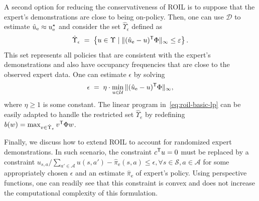\documentclass[10pt]{article}
\renewcommand{\cite}{\citep}
\theoremstyle{plain}
\theoremstyle{remark}
\begin{document}
A second option for reducing the conservativeness of ROIL is to suppose that the expert's demonstrations are close to being on-policy.
Then, one can use $\mathcal{D}$ to estimate $\hat{u}_{\mathrm{e}} \approx u_{\mathrm{e}}^{\mathnormal{\star}} $ and consider the set $\hat{\Upsilon}_{\epsilon}$ defined as
%
\begin{equation}
\label{linf_constraint}
\hat{\Upsilon}_{\epsilon}
\;=\;
\left\{ u \in \Upsilon \mid \| (\hat{u}_{\mathrm{e}} - u)^{\mathsf{T}} \Phi \|_{\infty} \le \varepsilon \right\}.
\end{equation}
This set represents all policies that are consistent with the expert's demonstrations and also have occupancy frequencies that are close to the observed expert data. One can estimate $\epsilon$ by solving
\begin{equation}\label{eq:minimal-epsilon}
\epsilon \; =\;  \eta \cdot \min_{u\in \mathcal{U}}
\| (\hat{u}_{\mathrm{e}} - u)^{\mathsf{T}} \Phi \|_{\infty}, 
\end{equation}
where $\eta \ge 1$ is some constant. %
The linear program in~\eqref{eq:roil-basic-lp} can be easily adapted to handle the restricted set $\hat{\Upsilon}_e$ by redefining $b(w) = \max_{v \in \hat{\Upsilon}_e} v^{\mathsf{T}} \Phi  w$. 

Finally, we discuss how to extend ROIL to account for randomized expert demonstrations. In such scenario, the constraint $c^{\mathsf{T}} u = 0$ must be replaced by a constraint $u_{s,a} / \sum_{a'\in \mathcal{A}} u(s,a') - \hat{\pi}_{\mathrm{e}}( s,a ) \le \epsilon, \forall s\in \mathcal{S}, a\in \mathcal{A}$ for some appropriately chosen $\epsilon$ and an estimate $\hat{\pi}_{\mathrm{e}}$ of expert's policy. Using perspective functions, one can readily see that this constraint is convex and does not increase the computational complexity of this formulation.

\end{document}

